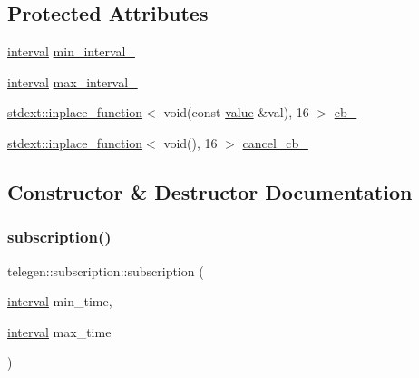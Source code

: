 \subsection*{Protected Attributes}
\begin{DoxyCompactItemize}
\item 
\hyperlink{namespacetelegen_ad925de2d0a99bc43918533abf0457344}{interval} \hyperlink{classtelegen_1_1subscription_a6aee0684ec18cb68e68c7110742dc625}{min\+\_\+interval\+\_\+}
\item 
\hyperlink{namespacetelegen_ad925de2d0a99bc43918533abf0457344}{interval} \hyperlink{classtelegen_1_1subscription_afbf8aaf4fdfd91ef0f210ade501c04b1}{max\+\_\+interval\+\_\+}
\item 
\hyperlink{classstdext_1_1inplace__function}{stdext\+::inplace\+\_\+function}$<$ void(const \hyperlink{classtelegen_1_1value}{value} \&val), 16 $>$ \hyperlink{classtelegen_1_1subscription_a63b2db928cfeebed477b61b58b9a6446}{cb\+\_\+}
\item 
\hyperlink{classstdext_1_1inplace__function}{stdext\+::inplace\+\_\+function}$<$ void(), 16 $>$ \hyperlink{classtelegen_1_1subscription_aea82d071d3075d6b3ae8b36bf05f2d0e}{cancel\+\_\+cb\+\_\+}
\end{DoxyCompactItemize}


\subsection{Constructor \& Destructor Documentation}
\mbox{\label{classtelegen_1_1subscription_a506c90eb0e3ba380473a742011ef3f3b}} 
\subsubsection{\texorpdfstring{subscription()}{subscription()}}
{\footnotesize\ttfamily telegen\+::subscription\+::subscription (\begin{DoxyParamCaption}\item[{\hyperlink{namespacetelegen_ad925de2d0a99bc43918533abf0457344}{interval}}]{min\+\_\+time,  }\item[{\hyperlink{namespacetelegen_ad925de2d0a99bc43918533abf0457344}{interval}}]{max\+\_\+time }\end{DoxyParamCaption})\hspace{0.3cm}{\ttfamily [inline]}}

